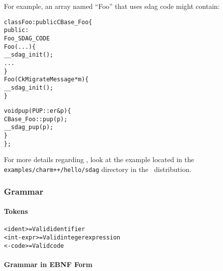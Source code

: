 For example, an array named ``Foo'' that uses sdag code might contain:

\begin{alltt}
class Foo : public CBase_Foo \{
public:
    Foo_SDAG_CODE
    Foo(...) \{
       __sdag_init();
       ...
    \}
    Foo(CkMigrateMessage *m) \{
       __sdag_init();
    \}
    
    void pup(PUP::er &p) \{
       CBase_Foo::pup(p);
       __sdag_pup(p);
    \}
\};
\end{alltt}

For more details regarding \sdag{}, look at the example located in the 
{\tt examples/charm++/hello/sdag} directory in the \charmpp\ distribution.


\subsubsection{Grammar}

\paragraph{Tokens}

\begin{alltt}
  <ident> = Valid \CC{} identifier 
  <int-expr> = Valid \CC{} integer expression 
  <\CC{}-code> = Valid \CC{} code 
\end{alltt}

\paragraph{Grammar in EBNF Form}

